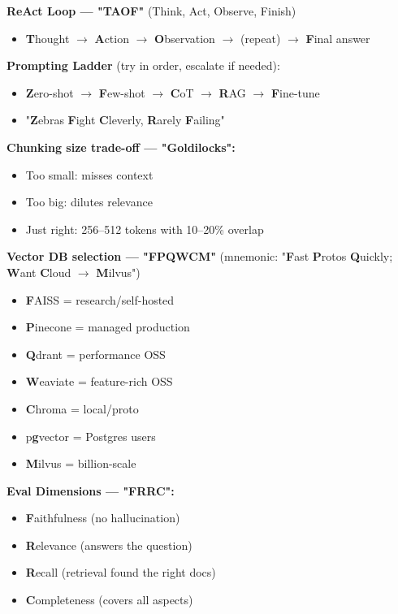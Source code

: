 \documentclass[11pt]{article}
\providecommand{\tightlist}{\setlength{\itemsep}{1pt}\setlength{\parskip}{0pt}}
\begin{document}
\textbf{ReAct Loop --- "TAOF"} (Think, Act, Observe, Finish)

\begin{itemize}
\tightlist
\item
  \textbf{T}hought \(\rightarrow\) \textbf{A}ction \(\rightarrow\) \textbf{O}bservation \(\rightarrow\) (repeat) \(\rightarrow\) \textbf{F}inal answer
\end{itemize}

\textbf{Prompting Ladder} (try in order, escalate if needed):

\begin{itemize}
\tightlist
\item
  \textbf{Z}ero-shot \(\rightarrow\) \textbf{F}ew-shot \(\rightarrow\) \textbf{C}oT \(\rightarrow\) \textbf{R}AG \(\rightarrow\) \textbf{F}ine-tune
\item
  "\textbf{Z}ebras \textbf{F}ight \textbf{C}leverly, \textbf{R}arely \textbf{F}ailing"
\end{itemize}

\textbf{Chunking size trade-off --- "Goldilocks":}

\begin{itemize}
\tightlist
\item
  Too small: misses context
\item
  Too big: dilutes relevance
\item
  Just right: 256--512 tokens with 10--20\% overlap
\end{itemize}

\textbf{Vector DB selection --- "FPQWCM"} (mnemonic: "\textbf{F}ast \textbf{P}rotos \textbf{Q}uickly; \textbf{W}ant \textbf{C}loud \(\rightarrow\) \textbf{M}ilvus")

\begin{itemize}
\tightlist
\item
  \textbf{F}AISS = research/self-hosted
\item
  \textbf{P}inecone = managed production
\item
  \textbf{Q}drant = performance OSS
\item
  \textbf{W}eaviate = feature-rich OSS
\item
  \textbf{C}hroma = local/proto
\item
  p\textbf{g}vector = Postgres users
\item
  \textbf{M}ilvus = billion-scale
\end{itemize}

\textbf{Eval Dimensions --- "FRRC":}

\begin{itemize}
\tightlist
\item
  \textbf{F}aithfulness (no hallucination)
\item
  \textbf{R}elevance (answers the question)
\item
  \textbf{R}ecall (retrieval found the right docs)
\item
  \textbf{C}ompleteness (covers all aspects)
\end{itemize}
\end{document}
